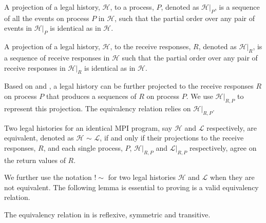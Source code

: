 
\begin{definition}\label{def:projection_process}
A projection of a legal history, $\mathcal{H}$, to a process, $P$, denoted as $\mathcal{H} | _P$, is a sequence of all the events on process $P$ in $\mathcal{H}$, such that the partial order over any pair of events in $\mathcal{H} | _P$ is identical as in $\mathcal{H}$.
\end{definition}

\begin{definition}\label{def:projection_receive}
A projection of a legal history, $\mathcal{H}$, to the receive responses, $R$, denoted as $\mathcal{H} | _R$, is a sequence of receive responses in $\mathcal{H}$ such that the partial order over any pair of receive responses in $\mathcal{H} | _R$ is identical as in $\mathcal{H}$.
\end{definition}

Based on  and , a legal history can be further projected to the receive responses $R$ on process $P$ that produces a sequences of $R$ on process $P$. We use $\mathcal{H} | _{R,P}$ to represent this projection. The equivalency relation relies on $\mathcal{H} | _{R,P}$.

\begin{definition}\label{def:er}
Two legal histories for an identical MPI program, say $\mathcal{H}$ and $\mathcal{L}$ respectively, are equivalent, denoted as $\mathcal{H}$ $\sim$ $\mathcal{L}$, if and only if their projections to the receive responses, $R$, and each single process, $P$, $\mathcal{H} | _{R,P}$ and $\mathcal{L} | _{R,P}$ respectively, agree on the return values of $R$.
\end{definition}

We further use the notation $!\sim$ for two legal histories $\mathcal{H}$ and $\mathcal{L}$ when they are not equivalent. The following lemma is essential to proving  is a valid equivalency relation.

\begin{lemma}\label{lemma:rst}
The equivalency relation in  is reflexive, symmetric and transitive.
\end{lemma}

